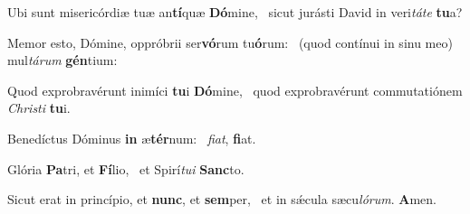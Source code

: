 \item Ubi sunt misericórdiæ tuæ an\textbf{tí}quæ \textbf{Dó}mine,~\psstar{} sicut jurásti David in veri\textit{táte} \textbf{tu}a?
\item Memor esto, Dómine, oppróbrii ser\textbf{vó}rum tu\textbf{ó}rum:~\psstar{} (quod contínui in sinu meo) mul\textit{tárum} \textbf{gén}tium:
\item Quod exprobravérunt inimíci \textbf{tu}i \textbf{Dó}mine,~\psstar{} quod exprobravérunt commutatiónem \textit{Christi} \textbf{tu}i.
\item Benedíctus Dóminus \textbf{in} æ\textbf{tér}num:~\psstar{} \textit{fiat}, \textbf{fi}at.
\item Glória \textbf{Pa}tri, et \textbf{Fí}lio,~\psstar{} et Spirí\textit{tui} \textbf{Sanc}to.
\item Sicut erat in princípio, et \textbf{nunc}, et \textbf{sem}per,~\psstar{} et in sǽcula sæcu\textit{lórum}. \textbf{A}men.